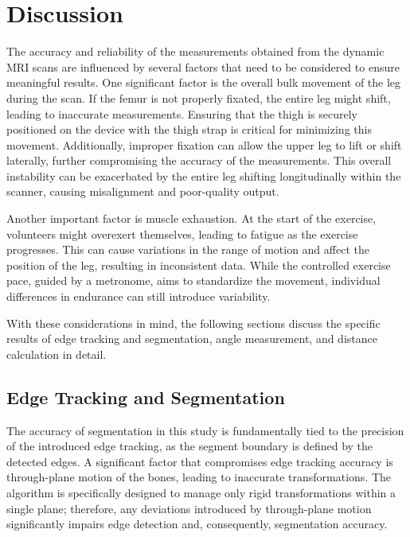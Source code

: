 \documentclass{micro-econ-thesis}
\begin{document}
\section{Discussion}

The accuracy and reliability of the measurements obtained from the dynamic MRI scans are influenced by several factors that need to be considered to ensure meaningful results. One significant factor is the overall bulk movement of the leg during the scan. If the femur is not properly fixated, the entire leg might shift, leading to inaccurate measurements. Ensuring that the thigh is securely positioned on the device with the thigh strap is critical for minimizing this movement. Additionally, improper fixation can allow the upper leg to lift or shift laterally, further compromising the accuracy of the measurements. This overall instability can be exacerbated by the entire leg shifting longitudinally within the scanner, causing misalignment and poor-quality output.

Another important factor is muscle exhaustion. At the start of the exercise, volunteers might overexert themselves, leading to fatigue as the exercise progresses. This can cause variations in the range of motion and affect the position of the leg, resulting in inconsistent data. While the controlled exercise pace, guided by a metronome, aims to standardize the movement, individual differences in endurance can still introduce variability.

With these considerations in mind, the following sections discuss the specific results of edge tracking and segmentation, angle measurement, and distance calculation in detail.

\subsection{Edge Tracking and Segmentation}
The accuracy of segmentation in this study is fundamentally tied to the precision of the introduced edge tracking, as the segment boundary is defined by the detected edges. A significant factor that compromises edge tracking accuracy is through-plane motion of the bones, leading to inaccurate transformations. The algorithm is specifically designed to manage only rigid transformations within a single plane; therefore, any deviations introduced by through-plane motion significantly impairs edge detection and, consequently, segmentation accuracy.
\end{document}
